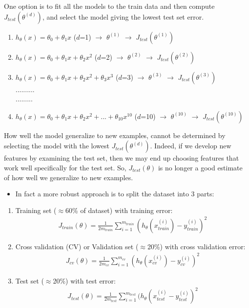 \documentclass[a4paper,12pt]{report}
\begin{document}
One option is to fit all the models to the train data and then compute $J_{test}(\theta^{(d)})$, and select the model giving the lowest test set error.
\begin{enumerate}
\item $h_{\theta}(x) = \theta_0 + \theta_1 x$  ($d$=1) $\rightarrow$ $\theta^{(1)}$  $\rightarrow$ $J_{test}(\theta^{(1)})$
\item $h_{\theta}(x) = \theta_0 + \theta_1 x + \theta_2 x^2$  ($d$=2) $\rightarrow$ $\theta^{(2)}$  $\rightarrow$ $J_{test}(\theta^{(2)})$
\item $h_{\theta}(x) = \theta_0 + \theta_1 x + \theta_2 x^2 + \theta_3 x^3$  ($d$=3) $\rightarrow$ $\theta^{(3)}$  $\rightarrow$ $J_{test}(\theta^{(3)})$\\ 
.......... \\
.........
\item $h_{\theta}(x) = \theta_0 + \theta_1 x + \theta_2 x^2 + ... +  \theta_{10} x^{10}$  ($d$=10) $\rightarrow$ $\theta^{(10)}$  $\rightarrow$  $J_{test}(\theta^{(10)})$
\end{enumerate}

How well the model generalize to new examples, cannot be determined by selecting the model with the lowest $J_{test}(\theta^{(d)})$. Indeed, if we develop new features by examining the test set, then we may end up choosing features that work well specifically for the test set. So, $J_{test}(\theta)$ is no longer a good estimate of how well we generalize to new examples.\\

\begin{itemize}
\item In fact a more robust approach is to split the dataset into 3 parts:
\end{itemize}
\begin{enumerate}
\item Training set ($\approx$60\% of dataset) with training error: \\
\begin{align}
J_{train}(\theta) = \frac{1}{2m_{train}} \sum_{i=1} ^{m_{train}} (h_{\theta} (x_{train} ^{(i)}) -y_{train} ^{(i)})^2
\end{align}
\item Cross validation (CV) or Validation set ($\approx$20\%) with cross validation error: \\
\begin{align}
J_{cv}(\theta) = \frac{1}{2m_{cv}} \sum_{i=1} ^{m_{cv}} (h_{\theta} (x_{cv} ^{(i)}) -y_{cv} ^{(i)})^2
\end{align}
\item Test set ($\approx$20\%) with test error: 
\begin{align}
J_{test}(\theta) = \frac{1}{2m_{test}} \sum_{i=1} ^{m_{test}} (h_{\theta} (x_{test} ^{(i)} -y_{test} ^{(i)})^2
\end{align}
\end{enumerate}
\end{document}
